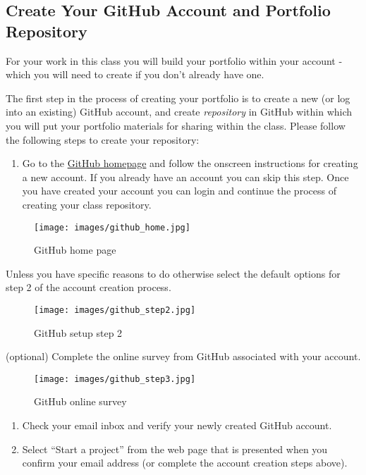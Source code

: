 \documentclass[]{book}
\providecommand{\tightlist}{%
  \setlength{\itemsep}{0pt}\setlength{\parskip}{0pt}}
\begin{document}
\subsection{Create Your GitHub Account and Portfolio
Repository}\label{create-your-github-account-and-portfolio-repository}

For your work in this class you will build your portfolio within your
account - which you will need to create if you don't already have one.

The first step in the process of creating your portfolio is to create a
new (or log into an existing) GitHub account, and create
\emph{repository} in GitHub within which you will put your portfolio
materials for sharing within the class. Please follow the following
steps to create your repository:

\begin{enumerate}
\def\labelenumi{\arabic{enumi}.}
\tightlist
\item
  Go to the \href{https://github.com/}{GitHub homepage} and follow the
  onscreen instructions for creating a new account. If you already have
  an account you can skip this step. Once you have created your account
  you can login and continue the process of creating your class
  repository.
\end{enumerate}

\begin{figure}[htbp]
\centering
\texttt{[image: images/github\_home.jpg]}
\caption{GitHub home page}
\end{figure}

Unless you have specific reasons to do otherwise select the default
options for step 2 of the account creation process.

\begin{figure}[htbp]
\centering
\texttt{[image: images/github\_step2.jpg]}
\caption{GitHub setup step 2}
\end{figure}

(optional) Complete the online survey from GitHub associated with your
account.

\begin{figure}[htbp]
\centering
\texttt{[image: images/github\_step3.jpg]}
\caption{GitHub online survey}
\end{figure}

\begin{enumerate}
\def\labelenumi{\arabic{enumi}.}
\setcounter{enumi}{1}
\item
  Check your email inbox and verify your newly created GitHub account.
\item
  Select ``Start a project'' from the web page that is presented when
  you confirm your email address (or complete the account creation steps
  above).
\end{enumerate}
\end{document}
